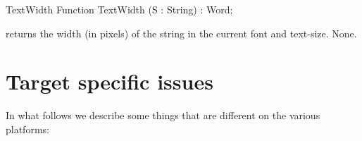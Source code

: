 \begin{function}{TextWidth}
\Declaration
Function TextWidth (S : String) : Word;

\Description
{} returns the width (in pixels) of the string  in
the current font and text-size.
\Errors
None.
\SeeAlso
{}
\end{function}

\section{Target specific issues}                                                                                                                                                                                                                                                               
In what follows we describe some things that are different on the various
platforms:

\subsection{\dos}
\subsection{\windows}
\subsection{\linux}

